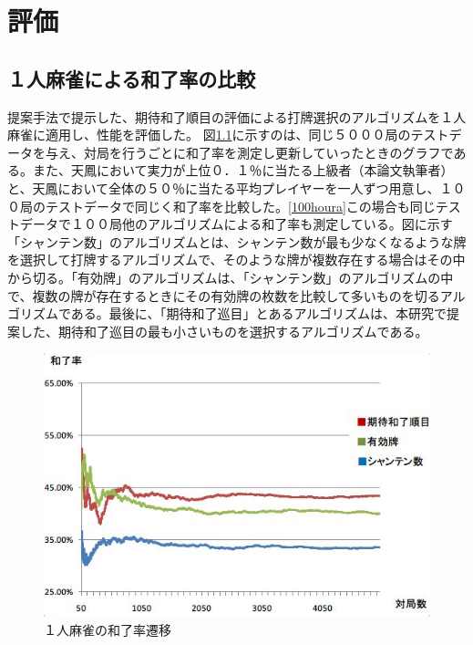\chapter{評価}
\label{chap:evaluation}
\section{１人麻雀による和了率の比較}
提案手法で提示した、期待和了順目の評価による打牌選択のアルゴリズムを１人麻雀に適用し、性能を評価した。
図\ref{1houra}に示すのは、同じ５０００局のテストデータを与え、対局を行うごとに和了率を測定し更新していったときのグラフである。また、天鳳において実力が上位０．１％に当たる上級者（本論文執筆者）と、天鳳において全体の５０％に当たる平均プレイヤーを一人ずつ用意し、１００局のテストデータで同じく和了率を比較した。\ref{100houra}この場合も同じテストデータで１００局他のアルゴリズムによる和了率も測定している。図に示す「シャンテン数」のアルゴリズムとは、シャンテン数が最も少なくなるような牌を選択して打牌するアルゴリズムで、そのような牌が複数存在する場合はその中から切る。「有効牌」のアルゴリズムは、「シャンテン数」のアルゴリズムの中で、複数の牌が存在するときにその有効牌の枚数を比較して多いものを切るアルゴリズムである。最後に、「期待和了巡目」とあるアルゴリズムは、本研究で提案した、期待和了巡目の最も小さいものを選択するアルゴリズムである。


\begin{figure}[h]
 \centering
 \includegraphics[keepaspectratio, scale=0.8,bb=0 0 549 374]
      {img/1houra.jpg}
 \caption{１人麻雀の和了率遷移}
 \label{1houra}
\end{figure}

